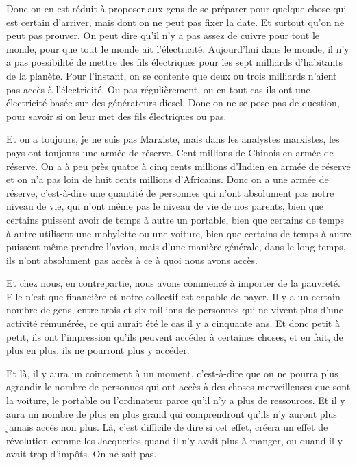 \begin{small}
Donc on en est réduit à proposer aux gens de se préparer pour quelque chose qui est certain d'arriver, mais dont on ne peut pas fixer la date. Et surtout qu'on ne peut pas prouver. On peut dire qu'il n'y a pas assez de cuivre pour tout le monde, pour que tout le monde ait l'électricité. Aujourd'hui dans le monde, il n'y a pas possibilité de mettre des fils électriques pour les sept milliards d’habitants de la planète. Pour l'instant, on se contente que deux ou trois milliards n'aient pas accès à l'électricité. Ou pas régulièrement, ou en tout cas ils ont une électricité basée sur des générateurs diesel. Donc on ne se pose pas de question, pour savoir si on leur met des fils électriques ou pas. 

\smallbreak
Et on a toujours, je ne suis pas Marxiste, mais dans les analystes marxistes, les pays ont toujours une armée de réserve. Cent millions de Chinois en armée de réserve. On a à peu près quatre à cinq cents millions d'Indien en armée de réserve et on n’a pas loin de huit cents millions d'Africains. Donc on a une armée de réserve, c'est-à-dire une quantité de personnes qui n'ont absolument pas notre niveau de vie, qui n'ont même pas le niveau de vie de nos parents, bien que certains puissent avoir de temps à autre un portable, bien que certains de temps à autre utilisent une mobylette ou une voiture, bien que certains de temps à autre puissent même prendre l'avion, mais d'une manière générale, dans le long temps, ils n'ont absolument pas accès à ce à quoi nous avons accès. 

Et chez nous, en contrepartie, nous avons commencé à importer de la pauvreté. Elle n'est que financière et notre collectif est capable de payer. Il y a un certain nombre de gens, entre trois et six millions de personnes qui ne vivent plus d'une activité rémunérée, ce qui aurait été le cas il y a cinquante ans. Et donc petit à petit, ils ont l'impression qu'ils peuvent accéder à certaines choses, et en fait, de plus en plus, ils ne pourront plus y accéder. 

Et là, il y aura un coincement à un moment, c'est-à-dire que on ne pourra plus agrandir le nombre de personnes qui ont accès à des choses merveilleuses que sont la voiture, le portable ou l'ordinateur parce qu’il n'y a plus de ressources. Et il y aura un nombre de plus en plus grand qui comprendront qu'ils n'y auront plus jamais accès non plus. Là, c'est difficile de dire si cet effet, créera un effet de révolution comme les Jacqueries quand il n'y avait plus à manger, ou quand il y avait trop d'impôts. On ne sait pas.


\end{small}
